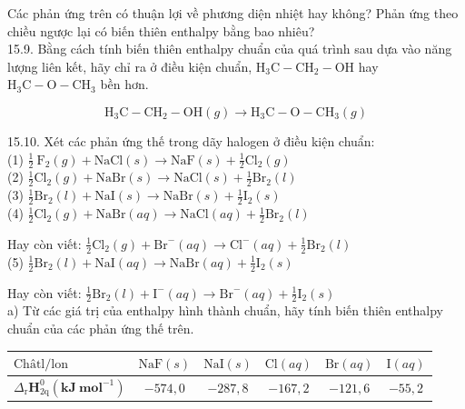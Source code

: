 \documentclass[10pt]{article}
\begin{document}
Các phản ứng trên có thuận lợi về phương diện nhiệt hay không? Phản ứng theo chiều ngược lại có biến thiên enthalpy bằng bao nhiêu?\\
15.9. Bằng cách tính biến thiên enthalpy chuẩn của quá trình sau dựa vào năng lượng liên kết, hãy chỉ ra ở điều kiện chuẩn, $\mathrm{H}_{3} \mathrm{C}-\mathrm{CH}_{2}-\mathrm{OH}$ hay $\mathrm{H}_{3} \mathrm{C}-\mathrm{O}-\mathrm{CH}_{3}$ bền hơn.

$$
\mathrm{H}_{3} \mathrm{C}-\mathrm{CH}_{2}-\mathrm{OH}(g) \rightarrow \mathrm{H}_{3} \mathrm{C}-\mathrm{O}-\mathrm{CH}_{3}(g)
$$

15.10. Xét các phản ứng thế trong dãy halogen ở điều kiện chuẩn:\\
(1) $\frac{1}{2} \mathrm{~F}_{2}(g)+\mathrm{NaCl}(s) \rightarrow \mathrm{NaF}(s)+\frac{1}{2} \mathrm{Cl}_{2}(g)$\\
(2) $\frac{1}{2} \mathrm{Cl}_{2}(g)+\mathrm{NaBr}(s) \rightarrow \mathrm{NaCl}(s)+\frac{1}{2} \mathrm{Br}_{2}(l)$\\
(3) $\frac{1}{2} \mathrm{Br}_{2}(l)+\mathrm{NaI}(s) \rightarrow \mathrm{NaBr}(s)+\frac{1}{2} \mathrm{I}_{2}(s)$\\
(4) $\frac{1}{2} \mathrm{Cl}_{2}(g)+\mathrm{NaBr}(a q) \rightarrow \mathrm{NaCl}(a q)+\frac{1}{2} \mathrm{Br}_{2}(l)$

Hay còn viết: $\frac{1}{2} \mathrm{Cl}_{2}(g)+\mathrm{Br}^{-}(a q) \rightarrow \mathrm{Cl}^{-}(a q)+\frac{1}{2} \mathrm{Br}_{2}(l)$\\
(5) $\frac{1}{2} \mathrm{Br}_{2}(l)+\mathrm{NaI}(a q) \rightarrow \mathrm{NaBr}(a q)+\frac{1}{2} \mathrm{I}_{2}(s)$

Hay còn viết: $\frac{1}{2} \mathrm{Br}_{2}(l)+\mathrm{I}^{-}(a q) \rightarrow \mathrm{Br}^{-}(a q)+\frac{1}{2} \mathrm{I}_{2}(s)$\\
a) Từ các giá trị của enthalpy hình thành chuẩn, hãy tính biến thiên enthalpy chuẩn của các phản ứng thế trên.

\begin{center}
\begin{tabular}{|l|c|c|c|c|c|}
\hline
$\mathrm{Châtl} / \mathrm{lon}$ & $\mathrm{NaF}(s)$ & $\mathrm{NaI}(s)$ & $\mathrm{Cl}(a q)$ & $\mathrm{Br}(a q)$ & $\mathrm{I}(a q)$ \\
\hline
$\Delta_{\mathrm{r}} \mathbf{H}_{2 \mathrm{q}}^{0}\left(\mathbf{k J ~ m o l}^{-1}\right)$ & $-574,0$ & $-287,8$ & $-167,2$ & $-121,6$ & $-55,2$ \\
\hline
\end{tabular}
\end{center}
\end{document}

